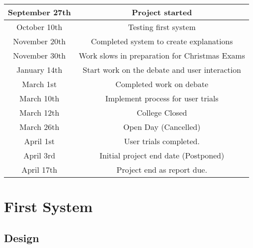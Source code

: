             \begin{tabular}{ |c|c| } 
                \hline
                September 27th      & Project started \\ 
                \hline
                October   10th      & Testing first system \\ 
                \hline
                November   20th     & Completed system to create explanations \\ 
                \hline
                November  30th      & Work slows in preparation for Christmas Exams \\ 
                \hline
                January 14th        & Start work on the debate and user interaction \\
                \hline
                March 1st           & Completed work on debate \\
                \hline
                March 10th          & Implement process for user trials\\
                \hline
                March 12th          & College Closed\\
                \hline
                March 26th          & Open Day (Cancelled)\\
                \hline
                April 1st           & User trials completed.\\
                \hline
                April 3rd           & Initial project end date (Postponed)\\
                \hline
                April 17th          & Project end as report due.\\
                \hline
            \end{tabular}
            
                    

    \section{First System}
        \subsection{Design}

